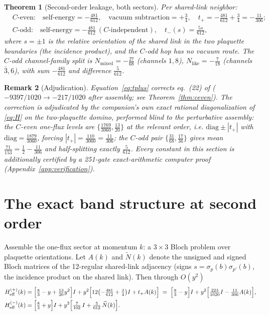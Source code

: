 \documentclass[11pt]{article}
\newtheorem{theorem}{Theorem}[section]
\newtheorem{remark}[theorem]{Remark}
\newcommand{\Nt}{\widetilde N}
\begin{document}
\begin{theorem}[Second-order leakage, both sectors]\label{thm:leakage}
Per shared-link neighbor:
\begin{align}
&C\text{-even:}\quad
\text{self-energy}=-\tfrac{481}{612},\quad
\text{vacuum subtraction}=+\tfrac34,\quad
t_+=-\tfrac{481}{612}+\tfrac34=-\tfrac{11}{306};
\label{eq:tplus}\\[2pt]
&C\text{-odd:}\quad
\text{self-energy}=-\tfrac{481}{612}\ (C\text{-independent}),\quad
t_-(s)=\tfrac{5s}{612},
\end{align}
where $s=\pm1$ is the relative orientation of the shared link in the two
plaquette boundaries (the incidence product), and the $C$-odd hop has no
vacuum route. The $C$-odd channel-family split is
$N_{\mathrm{mixed}}=-\tfrac{27}{68}$ (channels $1,8$),
$N_{\mathrm{like}}=-\tfrac{7}{18}$ (channels $\bar3,6$), with sum
$-\tfrac{481}{612}$ and difference $\tfrac{5}{612}$.
\end{theorem}

\begin{remark}[Adjudication]\label{rem:domino}
Equation~\eqref{eq:tplus} corrects eq.~(22) of \cite{companion}
($-9397/1020\to-217/1020$ after assembly; see Theorem~\ref{thm:ceven}).
The correction is adjudicated by the companion's own exact rational
diagonalization of \eqref{eq:H} on the two-plaquette domino, performed
\emph{blind} to the perturbative assembly: the $C$-even one-flux levels are
$\{\tfrac{1769}{3060},\tfrac{13}{20}\}$ at the relevant order, i.e.
$\mathrm{diag}\pm|t_+|$ with $\mathrm{diag}=\tfrac{1879}{3060}$, forcing
$|t_+|=\tfrac{110}{3060}=\tfrac{11}{306}$; the $C$-odd pair
$\{\tfrac{31}{68},\tfrac{17}{36}\}$ gives mean $\tfrac{71}{153}
=\tfrac12-\tfrac{11}{306}$ and half-splitting exactly $\tfrac{5}{612}$.
Every constant in this section is additionally certified by a 251-gate
exact-arithmetic computer proof (Appendix~\ref{app:verification}).
\end{remark}

\section{The exact band structure at second order}
\label{sec:band}

Assemble the one-flux sector at momentum $k$: a $3\times3$ Bloch problem over
plaquette orientations. Let $A(k)$ and $\Nt(k)$ denote the unsigned and
signed Bloch matrices of the 12-regular shared-link adjacency (signs
$s=\sigma_p(b)\sigma_{p'}(b)$, the incidence product on the shared link).
Then through $O(y^2)$
\begin{align}
H^{(+)}_{\mathrm{eff}}(k) &= \Bigl[\tfrac83-y+\tfrac{13}{20}y^2\Bigr] I
+ y^2\Bigl[12\bigl(-\tfrac{481}{612}+\tfrac34\bigr) I + t_+ A(k)\Bigr]
\;=\;\Bigl[\tfrac83-y\Bigr]I + y^2\Bigl[\tfrac{223}{1020}I
-\tfrac{11}{306}A(k)\Bigr],
\label{eq:Heven}\\
H^{(-)}_{\mathrm{eff}}(k) &= \Bigl[\tfrac83+y\Bigr] I
+ y^2\Bigl[\tfrac{7}{102}\,I+\tfrac{5}{612}\,\Nt(k)\Bigr].
\label{eq:Hodd}
\end{align}
\end{document}
